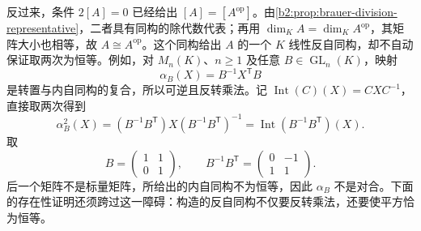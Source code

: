 反过来，条件 \(2[A]=0\) 已经给出 \([A]=[A^{\mathrm{op}}]\)。由\cref{b2:prop:brauer-division-representative}，二者具有同构的除代数代表；再用 \(\dim_KA=\dim_KA^{\mathrm{op}}\)，其矩阵大小也相等，故 \(A\cong A^{\mathrm{op}}\)。这个同构给出 \(A\) 的一个 \(K\) 线性反自同构，却不自动保证取两次为恒等。例如，对 \(M_n(K)\)、\(n\ge1\) 及任意 \(B\in\operatorname{GL}_n(K)\)，映射
\[
	\alpha_B(X)=B^{-1}X^{\mathsf T}B
\]
是转置与内自同构的复合，所以可逆且反转乘法。记 \(\operatorname{Int}(C)(X)=CXC^{-1}\)，直接取两次得到
\[
	\alpha_B^2(X) =(B^{-1}B^{\mathsf T})X(B^{-1}B^{\mathsf T})^{-1} =\operatorname{Int}(B^{-1}B^{\mathsf T})(X).
\]
取
\[
	B=\begin{pmatrix}1&1\\0&1\end{pmatrix},\qquad
	B^{-1}B^{\mathsf T}=\begin{pmatrix}0&-1\\1&1\end{pmatrix}.
\]
后一个矩阵不是标量矩阵，所给出的内自同构不为恒等，因此 \(\alpha_B\) 不是对合。下面的存在性证明还须跨过这一障碍：构造的反自同构不仅要反转乘法，还要使平方恰为恒等。

